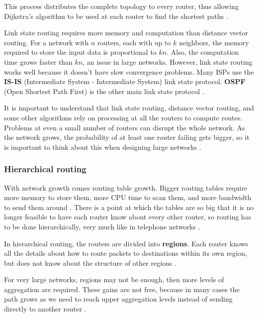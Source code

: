 This process distributes the complete topology to every router, thus allowing Dijkstra's algorithm to be used at each router to find the shortest paths \cite[p.~374]{computer-networks-tanenbaum-2012}.

Link state routing requires more memory and computation than distance vector routing.
For a network with \(n\) routers, each with up to \(k\) neighbors, the memory required to store the input data is proportional to \(kn\). Also, the computation time grows faster than \(kn\), an issue in large networks.
However, link state routing works well because it doesn't have slow convergence problems.
Many ISPs use the \textbf{IS-IS} (Intermediate System - Intermediate System) link state protocol.
\textbf{OSPF} (Open Shortest Path First) is the other main link state protocol \cite[p.~378]{computer-networks-tanenbaum-2012}.

It is important to understand that link state routing, distance vector routing, and some other algorithms rely on processing at all the routers to compute routes. Problems at even a small number of routers can disrupt the whole network. As the network grows, the probability of at least one router failing gets bigger, so it is important to think about this when designing large networks \cite[p.~378]{computer-networks-tanenbaum-2012}.

\subsubsection{Hierarchical routing}\label{Hierarchical routing}

With network growth comes routing table growth.
Bigger routing tables require more memory to store them, more CPU time to scan them, and more bandwidth to send them around \cite[p.~378]{computer-networks-tanenbaum-2012}.
There is a point at which the tables are so big that it is no longer feasible to have each router know about every other router, so routing has to be done hierarchically, very much like in telephone networks \cite[p.~379]{computer-networks-tanenbaum-2012}.

In hierarchical routing, the routers are divided into \textbf{regions}.
Each router knows all the details about how to route packets to destinations within its own region, but does not know about the structure of other regions \cite[p.~379]{computer-networks-tanenbaum-2012}.

For very large networks, regions may not be enough, then more levels of aggregation are required.
These gains are not free, because in many cases the path grows as we need to reach upper aggregation levels instead of sending directly to another router \cite[p.~379]{computer-networks-tanenbaum-2012}.

